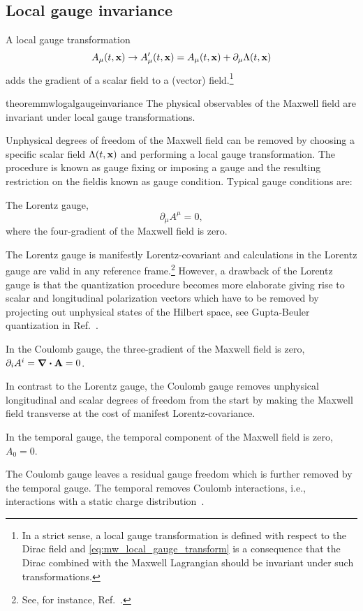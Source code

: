 \subsection{Local gauge invariance}
\begin{definition}
	A local gauge transformation
	\begin{equation}
		A_\mu(t,\vb{x})
		\to
		A_\mu^\prime(t,\vb{x})
		=
		A_\mu(t,\vb{x})
		+
		\partial_\mu\Lambda(t,\vb{x})
		\label{eq:mw_local_gauge_transform}
	\end{equation}
	adds the gradient of a scalar field to a (vector) field.\footnote{In a strict sense, a local gauge transformation is defined with respect to the Dirac field and \cref{eq:mw_local_gauge_transform} is a consequence that the Dirac combined with the Maxwell Lagrangian should be invariant under such transformations.}
\end{definition}
\begin{restatable}{theorem}{mwlogalgaugeinvariance}\label{thm:mw_local_gauge_invariance}
	The physical observables of the Maxwell field are invariant under local gauge transformations.
\end{restatable}
Unphysical degrees of freedom of the Maxwell field can be removed by choosing a specific scalar field $\Lambda(t,\vb{x})$ and performing a local gauge transformation.
The procedure is known as gauge fixing or imposing a gauge and the resulting restriction on the fieldis known as gauge condition.
Typical gauge conditions are:
\begin{definition}
	The Lorentz gauge,
	\begin{equation}
		\partial_\mu
		A^\mu
		=
		0
		,
	\end{equation}
	where the four-gradient of the Maxwell field is zero.
\end{definition}
The Lorentz gauge is manifestly Lorentz-covariant and calculations in the Lorentz gauge are valid in any reference frame.\footnote{See, for instance, Ref.~\cite[p.~144]{Greiner2013}.}
However, a drawback of the Lorentz gauge is that the quantization procedure becomes more elaborate giving rise to scalar and longitudinal polarization vectors which have to be removed by projecting out unphysical states of the Hilbert space, see Gupta-Beuler quantization in Ref.~\cite[p.~180]{Greiner2013}.
\begin{definition}
	In the Coulomb gauge, the three-gradient of the Maxwell field is zero, $\partial_iA^i=\div\vb{A}=0$.
\end{definition}
In contrast to the Lorentz gauge, the Coulomb gauge removes unphysical longitudinal and scalar degrees of freedom from the start by making the Maxwell field transverse at the cost of manifest Lorentz-covariance.
\begin{definition}
	In the temporal gauge, the temporal component of the Maxwell field is zero, $A_0=0$.
\end{definition}
The Coulomb gauge leaves a residual gauge freedom which is further removed by the temporal gauge.
The temporal removes Coulomb interactions, i.e., interactions with a static charge distribution~\cite[p.~200]{Greiner2013}.


